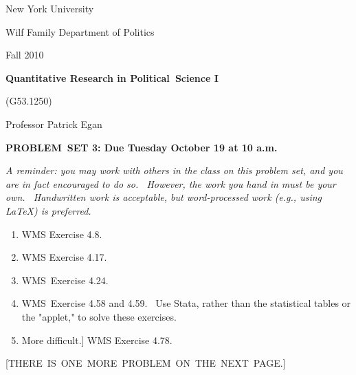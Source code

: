 \documentclass[11pt]{article}
\begin{document}
New York University

Wilf Family Department of Politics

Fall 2010

\begin{center}
{\large \textbf{Quantitative Research in Political\ Science I}}

(G53.1250)

Professor Patrick Egan

\bigskip

\textbf{PROBLEM\ SET 3: Due Tuesday October 19 at 10 a.m.}
\end{center}

\textit{A reminder: you may work with others in the class on this problem
set, and you are in fact encouraged to do so. \ However, the work you hand
in must be your own. \ Handwritten work is acceptable, but word-processed
work (e.g., using LaTeX) is preferred.}

\begin{enumerate}
\item WMS Exercise 4.8.\medskip 

\item WMS Exercise 4.17.\medskip 

\item WMS\ Exercise 4.24.\medskip 

\item WMS\ Exercise 4.58 and 4.59. \ Use Stata, rather than the statistical
tables or the "applet," to solve these exercises.\medskip 

\item \lbrack More difficult.] WMS Exercise 4.78. \medskip 
\end{enumerate}

\begin{center}
[THERE\ IS\ ONE\ MORE\ PROBLEM\ ON\ THE\ NEXT\ PAGE.]\newpage
\end{center}
\end{document}
